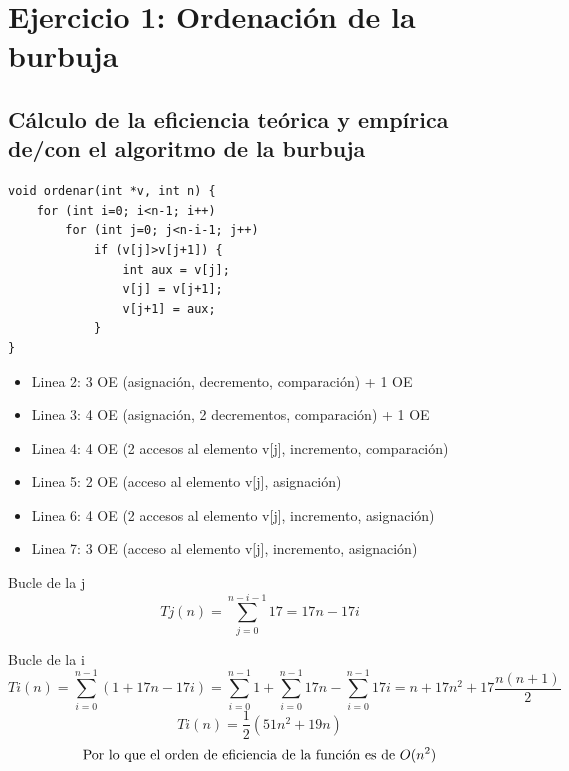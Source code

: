 \newpage


\section{Ejercicio 1: Ordenación de la burbuja}

\subsection{Cálculo de la eficiencia teórica y empírica de/con el algoritmo de la burbuja}

\begin {lstlisting}
void ordenar(int *v, int n) {						
	for (int i=0; i<n-1; i++)						
		for (int j=0; j<n-i-1; j++)
			if (v[j]>v[j+1]) {									
				int aux = v[j];		
				v[j] = v[j+1];						
				v[j+1] = aux;
			}
}
\end{lstlisting}

\begin{itemize}
	\item Linea 2: 3 OE (asignación, decremento, comparación) + 1 OE
	\item Linea 3: 4 OE (asignación, 2 decrementos, comparación) + 1 OE	
	\item Linea 4: 4 OE (2 accesos al elemento v[j], incremento, comparación)
	\item Linea 5: 2 OE (acceso al elemento v[j], asignación)
	\item Linea 6: 4 OE (2 accesos al elemento v[j], incremento, asignación)
	\item Linea 7: 3 OE (acceso al elemento v[j], incremento, asignación)
\end{itemize}

Bucle de la j
\begin{equation}
Tj (n)= \sum_{j=0}^{n-i-1}17 = 17 n-17i
\end{equation}

Bucle de la i
\begin{equation}
Ti (n)= \sum_{i=0}^{n-1}(1+17n-17i) = \sum_{i=0}^{n-1}1 + \sum_{i=0}^{n-1}17n - \sum_{i=0}^{n-1}17i = n+17n^2+17 \frac{n(n+1)}{2}	
\end{equation}
\begin{equation}
 Ti(n) = \frac12 (51n^2 + 19n)
\end{equation}
\begin{equation}
\textup{Por lo que el orden de eficiencia de la función es de }  O(n^2)
\end{equation}

